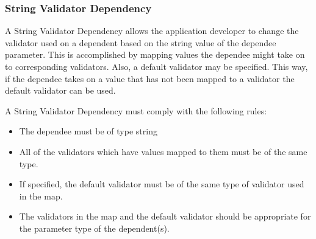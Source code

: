 \subsubsection{String Validator Dependency}
A String Validator Dependency allows the application developer to change the validator used on a dependent based on the string value of the dependee
parameter. This is accomplished by mapping values the dependee might take on to corresponding validators. Also, a default validator may be specified.
This way, if the dependee takes on a value that has not been mapped to a validator the default validator can be used. 

A String Validator Dependency must comply with the following rules:
\begin{itemize}
\item The dependee must be of type string
\item All of the validators which have values mapped to them must be of the same type.
\item If specified, the default validator must be of the same type of validator used in the map.
\item The validators in the map and the default validator should be appropriate for the parameter type of the dependent(s).
\end{itemize}

